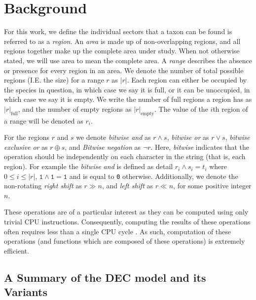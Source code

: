 \documentclass[a4paper]{article}
\newcommand{\CountFull}[1]{|#1|_\text{full}}
\newcommand{\CountEmpty}[1]{|#1|_\text{empty}}
\newcommand{\rand}[2]{#1 \land #2}
\newcommand{\ror}[2]{#1 \lor #2}
\newcommand{\rneg}[1]{\neg #1}
\newcommand{\rxor}[2]{#1 \oplus #2}
\newcommand{\rLshift}[2]{#1 \ll #2}
\newcommand{\rRshift}[2]{#1 \gg #2}
\begin{document}
\section{Background}

For this work, we define the individual sectors that a taxon can be found is referred to as a \textit{region}.
An \textit{area} is made up of non-overlapping regions, and all regions together make up the complete area under study.
When not otherwise stated, we will use area to mean the complete area.
A \textit{range} describes the absence or presence for every region in an area.
We denote the number of total possible regions (I.E. the size) for a range \( r \) as \( |r| \).
Each region can either be occupied by the species in question, in which case we say it is full, or it can be unoccupied,
in which case we say it is empty.
We write the number of full regions a region has as \( \CountFull{r} \), and the number of empty regions as \(
\CountEmpty{r} \).
The value of the $i$th region of a range will be denoted as $r_i$.

For the regions $r$ and $s$ we denote \textit{bitwise and} as $\rand{r}{s}$, \textit{bitwise or} as $\ror{r}{s}$,
\textit{bitwise exclusive or} as $\rxor{r}{s}$, and \textit{Bitwise negation} as $\rneg{r}$.
Here, \textit{bitwise} indicates that the operation should be independently on each character in the string (that is,
each region). 
For example the \textit{bitwise and} is defined as detail $r_i \land s_i = t_i$ where $0 \leq i \leq |r|$, $\texttt{1}
\land \texttt{1} = \texttt{1}$ and is equal to \texttt{0} otherwise.
Additionally, we denote the non-rotating \textit{right shift} as $\rRshift{r}{n}$, and \textit{left shift} as
$\rLshift{r}{n}$, for some positive integer $n$.

These operations are of a particular interest as they can be computed using only trivial CPU instructions.
Consequently, computing the results of these operations often requires less than a single CPU cycle\footnotemark
\citep{Abel19a}.
As such, computation of these operations (and functions which are composed of these operations) is extremely efficient.


\subsection{A Summary of the DEC model and its Variants} \label{sec:model}
\end{document}
